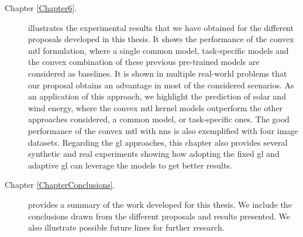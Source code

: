 \begin{description}
\item [{ Chapter \ref{Chapter6}}. ] illustrates the experimental results that we have obtained for the different proposals developed in this thesis. It shows the performance of the convex \acrshort{mtl} formulation, where a single common model, task-specific models and the convex combination of these previous pre-trained models are considered as baselines. It is shown in multiple real-world problems that our proposal obtains an advantage in most of the considered scenarios. As an application of this approach, we highlight the prediction of solar and wind energy, where the convex \acrshort{mtl} kernel models outperform the other approaches considered, a common model, or task-specific ones. The good performance of the convex \acrshort{mtl} with \acrshort{nns} is also exemplified with four image datasets. Regarding the \acrshort{gl} approaches, this chapter also provides several synthetic and real experiments showing how adopting the fixed \acrshort{gl} and adaptive \acrshort{gl} can leverage the models to get better results.

\item [{Chapter \ref{ChapterConclusions}}. ] provides a summary of the work developed for this thesis. We include the conclusions drawn from the different proposals and results presented. We also illustrate possible future lines for further research.

\end{description}


